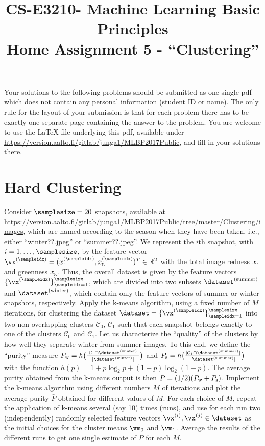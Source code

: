 \documentclass[article,11pt]{article}
\title{CS-E3210- Machine Learning Basic Principles \\ Home Assignment 5 - ``Clustering''}
\newcommand{\cluster}{\mathcal{C}}
\begin{document}
\date{}
\maketitle

Your solutions to the following problems should be submitted as one single pdf which does not contain 
any personal information (student ID or name).  The only rule for the layout of your submission is that for each 
problem there has to be exactly one separate page containing the answer to the problem. You are welcome to use the \LaTeX-file underlying this pdf, 
available under \url{https://version.aalto.fi/gitlab/junga1/MLBP2017Public}, and fill in your solutions there. 

\newpage

\section{Hard Clustering}
Consider $\samplesize=20$ snapshots, available at \url{https://version.aalto.fi/gitlab/junga1/MLBP2017Public/tree/master/Clustering/images}, 
which are named according to the season when they have been taken, i.e., either ``winter??.jpeg'' or ``summer??.jpeg''. 
We represent the $i$th snapshot, with $i=1,\ldots,\samplesize$, by the feature vector $\vx^{(\sampleidx)}=(x^{(\sampleidx)}_{\rm r},x^{(\sampleidx)}_{\rm g})^{T} \in \mathbb{R}^{2}$ with the total image 
redness $x_{\rm r}$ and greenness $x_{\rm g}$. Thus, the overall dataset is given by the feature vectors $ \{ \vx^{(\sampleidx)} \}_{\sampleidx=1}^{\samplesize}$, 
which are divided into two subsets $\dataset^{(\rm summer)}$ and $\dataset^{(\rm winter)}$, which contain only the feature vectors of summer or winter snapshots, respectively. 
Apply the k-means algorithm, using a fixed number of $M$ iterations, for clustering the dataset $\dataset= \{ \vx^{(\sampleidx)} \}_{\sampleidx=1}^{\samplesize}$ 
into two non-overlapping clusters $\mathcal{C}_{0}$, $\mathcal{C}_{1}$ such that each snapshot belongs exactly to one of the clusters $\mathcal{C}_{0}$ and $\mathcal{C}_{1}$. 
Let us characterize the ``quality'' of the clusters by how well they separate winter from summer images. To this end, we define the ``purity'' measure  
$P_{\rm w}= h \big( \frac{| \cluster_{1} \cap \dataset^{(\rm winter)}|}{| \dataset^{(\rm winter)} |}\big)$ and $P_{\rm s}= h \big( \frac{| \cluster_{1} \cap \dataset^{(\rm summer)}|}{| \dataset^{(\rm summer)} |}\big)$ 
with the function $h(p) = 1 + p \log_{2} p + (1-p) \log_{2} (1-p)$. The average purity obtained from the k-means output is then $\bar{P} = (1/2) ( P_{\rm w} +  P_{\rm s} )$. 
Implement the k-means algorithm using different numbers $M$ of iterations and plot the average purity $\bar{P}$ obtained for different values of $M$. 
For each choice of $M$, repeat the application of k-means several (say 10) times (runs), and use for each run two (independently) randomly selected feature vectors $\vx^{(i)},\vx^{(j)} \in \dataset$ as 
the initial choices for the cluster means $\vm_{0}$ and $\vm_{1}$. Average the results of the different runs to get one single estimate of $\bar{P}$ for each $M$. 
 
\end{document}
